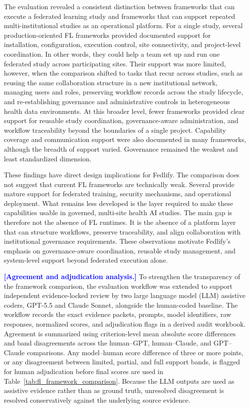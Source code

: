 \documentclass[preprint,5p, 10pt, times]{elsarticle}
\begin{document}
The evaluation revealed a consistent distinction between frameworks that can execute a federated learning study and frameworks that can support repeated multi-institutional studies as an operational platform. For a single study, several production-oriented FL frameworks provided documented support for installation, configuration, execution control, site connectivity, and project-level coordination. In other words, they could help a team set up and run one federated study across participating sites. Their support was more limited, however, when the comparison shifted to tasks that recur across studies, such as reusing the same collaboration structure in a new institutional network, managing users and roles, preserving workflow records across the study lifecycle, and re-establishing governance and administrative controls in heterogeneous health data environments. At this broader level, fewer frameworks provided clear support for reusable study coordination, governance-aware administration, and workflow traceability beyond the boundaries of a single project.
Capability coverage and communication support were also documented in many frameworks, although the breadth of support varied. 
Governance remained the weakest and least standardized dimension.

These findings have direct design implications for Fedlify. The comparison does not suggest that current FL frameworks are technically weak. 
Several provide mature support for federated training, security mechanisms, and operational deployment. 
What remains less developed is the layer required to make these capabilities usable in governed, multi-site health AI studies. 
The main gap is therefore not the absence of FL runtimes. It is the absence of a platform layer that can structure workflows, preserve traceability, and align collaboration with institutional governance requirements. 
These observations motivate Fedlify’s emphasis on governance-aware coordination, reusable study management, and system-level support beyond federated execution alone.

\textcolor{blue}{\textbf{[Agreement and adjudication analysis.]}}
To strengthen the transparency of the framework comparison, the evaluation workflow was extended to support independent evidence-locked review by two large language model (LLM) assistive coders, GPT-5.5 and Claude Sonnet, alongside the human-coded baseline. 
The workflow records the exact evidence packets, prompts, model identifiers, raw responses, normalized scores, and adjudication flags in a derived audit workbook. 
Agreement is summarized using criterion-level mean absolute score differences and band disagreements across the human--GPT, human--Claude, and GPT--Claude comparisons. 
Any model--human score difference of three or more points, or any disagreement between limited, partial, and full support bands, is flagged for human adjudication before final scores are used in Table~\ref{tab:fl_framework_comparison}.
Because the LLM outputs are used as assistive evidence rather than as ground truth, unresolved disagreement is resolved conservatively against the underlying source evidence.
\end{document}

